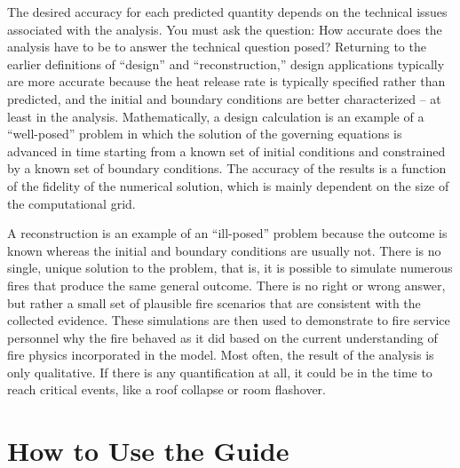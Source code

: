 The desired accuracy for each predicted quantity depends on the  technical  issues  associated with  the
analysis.  You must ask the question: How accurate does  the analysis have to
be  to  answer  the  technical  question posed?
Returning   to    the   earlier   definitions    of   ``design''   and
``reconstruction,''  design applications  typically are  more accurate
because the heat release rate is typically specified rather than predicted, and
the    initial    and    boundary    conditions   are    better
characterized -- at least in the analysis. Mathematically, a design calculation is an example of a
``well-posed''  problem  in  which   the  solution  of  the  governing
equations is  advanced in  time starting from  a known set  of initial
conditions and constrained by a known set of boundary conditions.  The
accuracy of the results is a function of the fidelity of the numerical
solution, which is  mainly dependent on the size  of the computational
grid.

A reconstruction is an example of an ``ill-posed'' problem because the
outcome  is known  whereas  the initial  and  boundary conditions  are usually
not. There is  no single, unique solution to the  problem, that is, it
is possible to simulate numerous fires that produce the same general outcome.
There is no right or wrong answer, but rather a small set of plausible
fire scenarios that are  consistent with the collected evidence. These
simulations are then used to demonstrate to fire service personnel why
the fire behaved as it did  based on the current understanding of fire
physics  incorporated in  the model.  Most  often, the  result of  the
analysis is only  qualitative. If there is any  quantification at all,
it could be in the time to reach critical events, like a roof collapse
or room flashover.


\section{How to Use the Guide}

